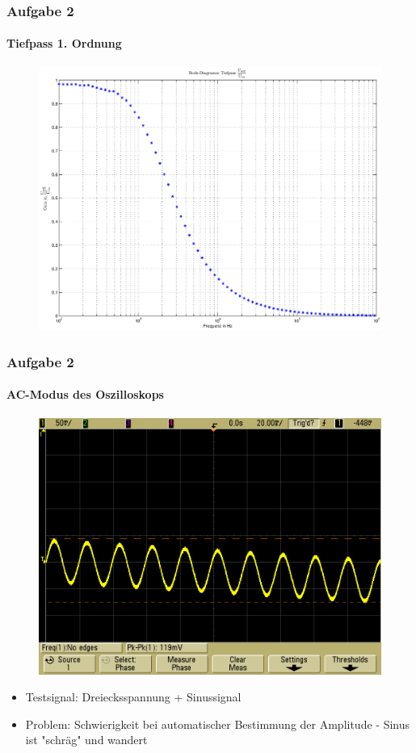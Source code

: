 \begin{frame}
\frametitle{Aufgabe 2}
\framesubtitle{Tiefpass 1. Ordnung}
\begin{figure}[H]
\begin{center}
        \includegraphics[scale=0.3]{./img/2a_bode_tief_UoutUin.eps}
\end{center}
\end{figure}
\end{frame}

\begin{frame}
\frametitle{Aufgabe 2}
\framesubtitle{AC-Modus des Oszilloskops}
\begin{figure}[H]
\begin{center}
        \includegraphics[scale=0.2]{./img/2c_Testsignal_1.png}
\end{center}
\end{figure}
\begin{itemize}
    \item Testsignal: Dreiecksspannung + Sinussignal
    \item Problem: Schwierigkeit bei automatischer Bestimmung der
    Amplitude - Sinus ist "schräg" und wandert
\end{itemize}
\end{frame}

